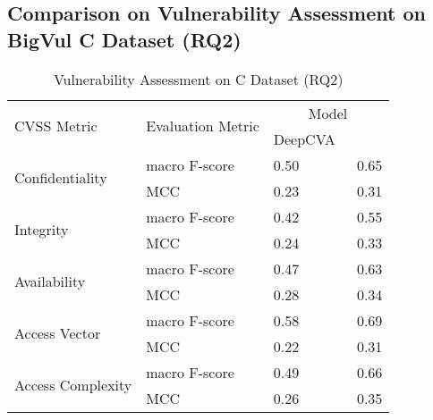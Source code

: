\subsection{\bf Comparison on Vulnerability Assessment on BigVul C Dataset (RQ2)}




\begin{table}[t]
	\caption{Vulnerability Assessment on C Dataset (RQ2)}
        \vspace{-9pt}
	\begin{center}
                \small
		\renewcommand{\arraystretch}{1}
		\begin{tabular}{l|p{1.9cm}<{\centering}|p{1.6cm}<{\centering}|p{1.5cm}<{\centering}}
			\hline
			\multirow{2}{*}{CVSS Metric}     & \multirow{2}{*}{Evaluation Metric}  & \multicolumn{2}{c}{Model}\\
			\cline{3-4}
		                                     &                                     & DeepCVA~\cite{deepCVA-ase21}    & {\tool}       \\
		    \hline
			\multirow{2}{*}{Confidentiality} & macro F-score                             &     0.50       & 0.65\\
			\cline{2-4}
			                                 & MCC                                 &      0.23      & 0.31\\
			\hline
			\multirow{2}{*}{Integrity}       & macro F-score                             &    0.42        & 0.55\\
			\cline{2-4}
			                                 & MCC                                 &    0.24        & 0.33\\
			\hline
			\multirow{2}{*}{Availability}    & macro F-score                             &   0.47         & 0.63\\
			\cline{2-4}
			                                 & MCC                                 &    0.28        & 0.34\\
			\hline
			\multirow{2}{*}{Access Vector}   & macro F-score                             &   0.58         & 0.69\\
			\cline{2-4}
			                                 & MCC                                 &    0.22        & 0.31\\
			\hline
			\multirow{2}{*}{Access Complexity} & macro F-score                           &   0.49         & 0.66\\
			\cline{2-4}
			                                 & MCC                                 &    0.26        & 0.35\\

\end{tabular}
\end{center}
\end{table}
